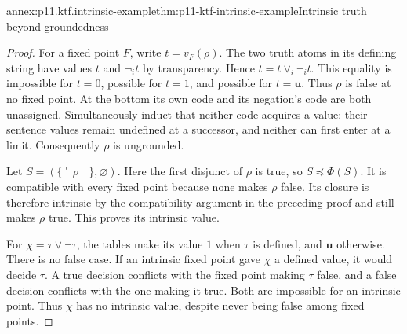 \begin{annexitem}{annex:p11.ktf.intrinsic-example}{thm:p11-ktf-intrinsic-example}{Intrinsic truth beyond groundedness}
\begin{proof}
For a fixed point \(F\), write \(t=v_F(\rho)\). The two truth
atoms in its defining string have values \(t\) and \(\neg_i t\)
by transparency. Hence \(t=t\lor_i\neg_i t\). This equality is
impossible for \(t=0\), possible for \(t=1\), and possible for
\(t=\mathbf u\). Thus \(\rho\) is false at no fixed point.
At the bottom its own code and its negation's code are both unassigned.
Simultaneously induct that neither code acquires a value: their sentence
values remain undefined at a successor, and neither can first enter at
a limit. Consequently \(\rho\) is ungrounded.

Let \(S=(\{\ulcorner\rho\urcorner\},\varnothing)\). Here the
first disjunct of \(\rho\) is true, so \(S\preceq\Phi(S)\).
It is compatible with every fixed point because none makes \(\rho\)
false. Its closure is therefore intrinsic by the compatibility argument
in the preceding proof and still makes \(\rho\) true. This proves
its intrinsic value.

For \(\chi=\tau\lor\neg\tau\), the tables make its value
\(1\) when \(\tau\) is defined, and \(\mathbf u\) otherwise.
There is no false case. If an intrinsic fixed point gave \(\chi\)
a defined value, it would decide \(\tau\). A true decision conflicts
with the fixed point making \(\tau\) false, and a false decision
conflicts with the one making it true. Both are impossible for an
intrinsic point. Thus \(\chi\) has no intrinsic value, despite
never being false among fixed points.
\end{proof}
\end{annexitem}

